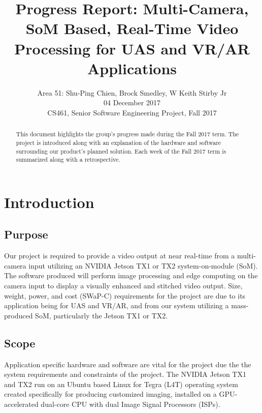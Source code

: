 \documentclass[letterpaper,10pt,serif,draftclsnofoot,onecolumn,compsoc,titlepage]{IEEEtran}
\title{Progress Report: Multi-Camera, SoM Based, Real-Time Video Processing for UAS and VR/AR Applications}
\author{Area 51: Shu-Ping Chien, Brock Smedley, W Keith Stirby Jr \\ 04 December 2017 \\ CS461, Senior Software Engineering Project, Fall 2017}
\begin{document}
\begin{titlepage}
\maketitle

\begin{abstract}

This document highlights the group's progress made during the Fall 2017 term. The 
project is introduced along with an explanation of the hardware and software 
surrounding our product's planned solution. Each week of the Fall 2017 term is 
summarized along with a retrospective. \\

\thispagestyle{empty}
\end{abstract}
\end{titlepage}

\newpage
\tableofcontents

\newpage

\section{Introduction}

\subsection{Purpose}

Our project is required to provide a video output at near real-time from a 
multi-camera input utilizing an NVIDIA Jetson TX1 or TX2 system-on-module (SoM). 
The software produced will perform image processing and edge computing on the 
camera input to display a visually enhanced and stitched video output. 
Size, weight, power, and cost (SWaP-C) requirements for the project are due 
to its application being for UAS and VR/AR, and from our system utilizing a 
mass-produced SoM, particularly the Jetson TX1 or TX2.  

\subsection{Scope}
 
Application specific hardware and software are vital for the project due the the 
system requirements and constraints of the project.
The NVIDIA Jetson TX1 and TX2 run on an Ubuntu based Linux for Tegra (L4T) operating 
system created specifically for producing customized imaging, installed on a 
GPU-accelerated dual-core CPU with dual Image Signal Processors (ISPs). 
\end{document}

